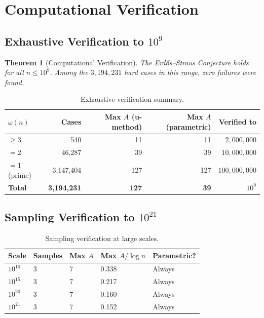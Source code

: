 \documentclass[11pt,a4paper]{article}
\theoremstyle{plain}
\newtheorem{theorem}{Theorem}[section]
\theoremstyle{plain}
\theoremstyle{definition}
\numberwithin{equation}{section}
\begin{document}
\clearpage

\section{Computational Verification}

\subsection{Exhaustive Verification to \texorpdfstring{$10^9$}{10^9}}

\begin{theorem}[Computational Verification]\label{thm:comp}
The Erd\H{o}s--Straus Conjecture holds for all $n \leq 10^9$. Among the $3{,}194{,}231$ hard cases in this range, zero failures were found.
\end{theorem}

\begin{table}[h]
\centering
\begin{tabular}{lrrrr}
\toprule
$\omega(n)$ & Cases & Max $A$ (u-method) & Max $A$ (parametric) & Verified to \\
\midrule
$\geq 3$ & 540 & 11 & 11 & $2{,}000{,}000$ \\
$= 2$ & 46,287 & 39 & 39 & $10{,}000{,}000$ \\
$= 1$ (prime) & 3,147,404 & 127 & 127 & $100{,}000,000$ \\
\midrule
\textbf{Total} & \textbf{3,194,231} & \textbf{127} & \textbf{39} & $10^9$ \\
\bottomrule
\end{tabular}
\caption{Exhaustive verification summary.}
\end{table}

\subsection{Sampling Verification to \texorpdfstring{$10^{21}$}{10²¹}}

\begin{table}[h]
\centering
\begin{tabular}{lllll}
\toprule
Scale & Samples & Max $A$ & Max $A/\log n$ & Parametric? \\
\midrule
$10^{10}$ & 3 & 7 & 0.338 & Always \\
$10^{15}$ & 3 & 7 & 0.217 & Always \\
$10^{20}$ & 3 & 7 & 0.160 & Always \\
$10^{21}$ & 3 & 7 & 0.152 & Always \\
\bottomrule
\end{tabular}
\caption{Sampling verification at large scales.}
\end{table}
\end{document}
